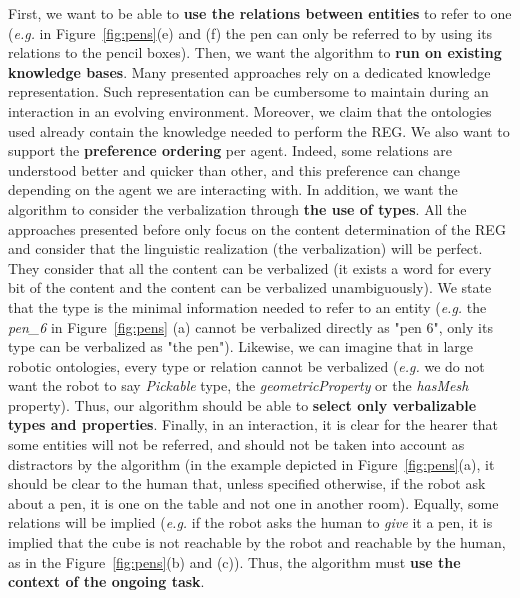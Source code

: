 \documentclass[a4paper,11pt,twoside]{StyleThese}
\begin{document}
First, we want to be able to \textbf{use the relations between entities} to refer to one (\textit{e.g.} in Figure~\ref{fig:pens}(e) and (f) the pen can only be referred to by using its relations to the pencil boxes). 
Then, we want the algorithm to \textbf{run on existing knowledge bases}. Many presented approaches rely on a dedicated knowledge representation. Such representation can be cumbersome to maintain during an interaction in an evolving environment. 
Moreover, we claim that the ontologies used already contain the knowledge needed to perform the REG. We also want to support the \textbf{preference ordering} per agent. Indeed, some relations are understood better and quicker than other, and this preference can change depending on the agent we are interacting with. 
In addition, we want the algorithm to consider the verbalization through \textbf{the use of types}. All the approaches presented before only focus on the content determination of the REG and consider that the linguistic realization (the verbalization) will be perfect. They consider that all the content can be verbalized (it exists a word for every bit of the content and the content can be verbalized unambiguously). We state that the type is the minimal information needed to refer to an entity (\textit{e.g.} the \textit{pen\_6} in Figure~\ref{fig:pens} (a) cannot be verbalized directly as "pen 6", only its type can be verbalized as "the pen").
Likewise, we can imagine that in large robotic ontologies, every type or relation cannot be verbalized (\textit{e.g.} we do not want the robot to say \textit{Pickable} type, the \textit{geometricProperty} or the \textit{hasMesh} property). Thus, our algorithm should be able to \textbf{select only verbalizable types and properties}.
Finally, in an interaction, it is clear for the hearer that some entities will not be referred, and should not be taken into account as distractors by the algorithm (in the example depicted in Figure~\ref{fig:pens}(a), it should be clear to the human that, unless specified otherwise, if the robot ask about a pen, it is one on the table and not one in another room). Equally, some relations will be implied (\textit{e.g.} if the robot asks the human to \textit{give} it a pen, it is implied that the cube is not reachable by the robot and reachable by the human, as in the Figure~\ref{fig:pens}(b) and (c)). Thus, the algorithm must \textbf{use the context of the ongoing task}.
\end{document}
